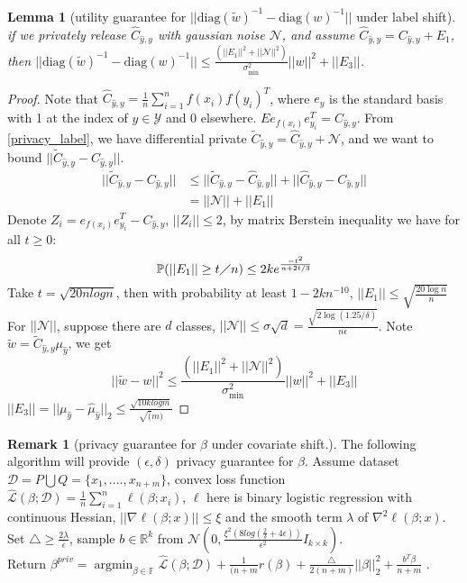 \documentclass{article}
\newcommand{\argmin}{\mathop{\mathrm{argmin}}}
\def\diag{\mathrm{diag}}
\def\cD{\mathcal{D}}
\def\cL{\mathcal{L}}
\def\cN{\mathcal{N}}
\def\cY{\mathcal{Y}}
\newtheorem{lemma}{Lemma}
\theoremstyle{definition}
\newtheorem*{remark}{Remark}
\begin{document}
\begin{lemma}[{utility guarantee for $||{\diag(\tilde{w})}^{-1} - {\diag(w)}^{-1}||$} under label shift] 
	
	if we privately release $\hat{C}_{\hat y,y}$ with gaussian noise $\cN$, and assume $\hat{C}_{\hat y,y} = C_{\hat y, y} + E_1$, then $||{\diag(\tilde{w})}^{-1} - {\diag(w)}^{-1}|| \leq \frac{(||E_1||^2 + ||\cN||^2)}{\sigma_{\min}^2}||w||^2 + ||E_3||$.
\end{lemma} 
\begin{proof}
	Note that $\hat C_{\hat y, y} = \frac{1}{n}\sum_{i=1}^nf(x_i)f(y_i)^T$, where $e_y$ is the standard basis with 1 at the index of $y \in \cY$ and 0 elsewhere. $E e_{f(x_i)}e_{y_i}^T = C_{\hat y,y}$. From \eqref{privacy_label}, we have differential private $\tilde {C}_{\hat y, y} = \hat C_{\hat y, y}  + \cN$, and we want to bound $||\tilde C_{\hat y,y} - C_{\hat y, y}||$.
	\begin{align}
	||\tilde C_{\hat y,y} - C_{\hat y, y}|| & \leq ||\tilde C_{\hat y,y} -\hat C_{\hat y, y}|| + ||\hat C_{\hat y,y} - C_{\hat y, y}|| \\
	& = ||\cN|| + ||E_1||
	\end{align}
	Denote $Z_i = e_{f(x_i)}e_{y_i}^T - C_{\hat y , y}$, $||Z_i|| \leq 2$, by matrix Berstein inequality we have for all $t \geq 0$:
	$$
	\mathbb{P}(||E_1|| \geq t \diagup n) \leq 2ke^{\frac{-t^2}{n+2t/3}}
	$$
	Take $t = \sqrt{20nlogn}$, then with probability at least $1 - 2kn^{-10}$, $||E_1|| \leq \sqrt{\frac{20 \log n}{n}}$
	For $||\cN||$, suppose there are $d$ classes, $||\cN|| \leq \sigma \sqrt{d} = \frac{\sqrt{2 \log(1.25 /\delta)}}{n \epsilon}$. Note $\tilde w = \tilde C_{\hat y, y} \mu_{\hat y}$, we get 
	$$
	||\tilde w  -w||^2 \leq \frac{(||E_1||^2 + ||\cN||^2)}{\sigma_{\min}^2}||w||^2 + ||E_3||
	$$
	$||E_3|| =||\mu_{\hat y} -\hat{\mu}_{\hat y}||_2 \leq{\frac{\sqrt{10k log m}}{\sqrt(m)}}$
\end{proof}
\begin{remark}[privacy guarantee for $\beta$ under covariate shift.] The following algorithm will provide $(\epsilon, \delta)$ privacy guarantee for $\beta$.
	Assume dataset $\cD = P \bigcup Q =\{x_1 ,....,x_{n+m}\}$, convex loss function $\hat{\cL}(\beta; \cD) = \frac{1}{n}\sum_{i=1}^n \ell(\beta; x_i)$, $\ell$ here is binary logistic regression with continuous Hessian, $||\nabla \ell(\beta;x)|| \leq \xi$ and the smooth term $\lambda$ of $\nabla^2 \ell(\beta; x)$. \\
	Set $\triangle \geq \frac{2\lambda}{\epsilon}$, sample $b \in \mathbb{R}^k$ from $\cN(0, \frac{\xi^2(8 log(\frac{2}{\delta}+4\epsilon))}{\epsilon^2}I_{k \times k})$. \\Return $\beta^{priv} = \argmin_{\beta \in \mathbb{F}} \hat{\cL}(\beta; \cD) + \frac{1}{(n+m}r(\beta) +\frac{\triangle}{2(n+m)}||\beta||_2^2+ \frac{b^T\beta}{n+m}$ . 
\end{remark}
\end{document}
